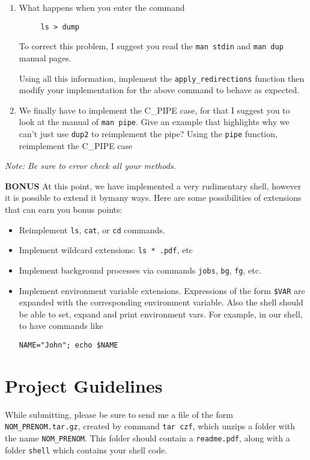 \documentclass[11pt]{article}
\begin{document}
\begin{enumerate}
 \bigskip
 
 \item What happens when you enter the command
 \begin{verbatim}
 	 ls > dump
 \end{verbatim}To correct this problem, I suggest you read the \texttt{man stdin} and \texttt{man dup} manual pages. 

Using all this information, implement the \texttt{apply\_redirections} function then modify your implementation for the above command to behave as expected.

\bigskip

\item We finally have to implement the C\_PIPE case, for that I suggest you to look at the manual of \texttt{man pipe}. Give an example that highlights why we can't just use \texttt{dup2} to reimplement the pipe? Using the \texttt{pipe} function, reimplement the C\_PIPE case

 \bigskip
 \end{enumerate}

\emph{Note: Be sure to error check all your methods.}
 \bigskip

\textbf{BONUS} At this point, we have implemented a very rudimentary shell, however it is possible to extend it bymany ways. Here are some possibilities of extensions that can earn you bonus points:
\begin{itemize}
	\item Reimplement \texttt{ls}, \texttt{cat}, or \texttt{cd} commands.
	\item Implement wildcard extensions: \texttt{ls * .pdf}, etc
	\item Implement background processes via commands \texttt{jobs}, \texttt{bg}, \texttt{fg}, etc.
	\item Implement environment variable extensions. Expressions of the form \texttt{\${VAR}} are expanded with the corresponding environment variable. Also the shell should be able to set, expand and print environment vars. For example, in our shell, to have commands like
	
	 \texttt{NAME="John"; echo \$NAME}
	
\end{itemize} 

\section*{Project Guidelines}

While submitting, please be sure to send me a file of the form \texttt{NOM\_PRENOM.tar.gz}, created by command \texttt{tar czf}, which unzips a folder with the name \texttt{NOM\_PRENOM}. This folder should contain a \texttt{readme.pdf}, along with a folder \texttt{shell} which contains your shell code. 
\end{document}
